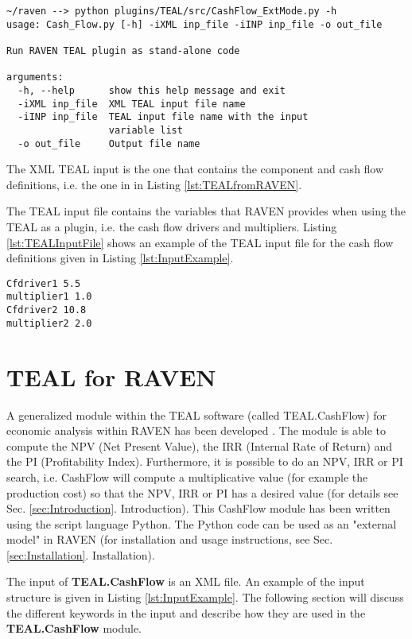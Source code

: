 \small
\begin{lstlisting}[caption=TEAL run as stand-alone python code, label=lst:TEALAsCode]
~/raven --> python plugins/TEAL/src/CashFlow_ExtMode.py -h
usage: Cash_Flow.py [-h] -iXML inp_file -iINP inp_file -o out_file

Run RAVEN TEAL plugin as stand-alone code

arguments:
  -h, --help      show this help message and exit
  -iXML inp_file  XML TEAL input file name
  -iINP inp_file  TEAL input file name with the input
                  variable list
  -o out_file     Output file name
\end{lstlisting}
\normalsize

The XML TEAL input is the one that contains the component and cash flow definitions, i.e. the one in  in Listing \ref{lst:TEALfromRAVEN}.

The TEAL input file contains the variables that RAVEN provides when using the TEAL as a plugin, i.e. the cash flow drivers and multipliers. Listing \ref{lst:TEALInputFile} shows an example of the TEAL input file for the cash flow definitions given in Listing \ref{lst:InputExample}.

\begin{lstlisting}[caption=TEAL run as stand-alone python code, label=lst:TEALInputFile]
Cfdriver1 5.5
multiplier1 1.0
Cfdriver2 10.8
multiplier2 2.0
\end{lstlisting}

\section{TEAL for RAVEN}
A generalized module within the TEAL software (called TEAL.CashFlow) for economic analysis within RAVEN has been developed \cite{MSApril2017}. The module is able to compute
the NPV (Net Present Value), the IRR (Internal Rate of Return) and the PI (Profitability Index). Furthermore, it is possible to
do an NPV, IRR or PI search, i.e. CashFlow will compute a multiplicative value (for example the production cost) so that the
NPV, IRR or PI has a desired value (for details see Sec. \ref{sec:Introduction}. Introduction). This CashFlow module has been written using the script language Python.
The Python code can be used as an "external model" in RAVEN (for installation and usage instructions, see Sec. \ref{sec:Installation}. Installation).

The input of \textbf{TEAL.CashFlow} is an XML file. An example of the input structure is given in Listing \ref{lst:InputExample}. The following section will discuss the
 different keywords in the input and describe how they are used in the \textbf{TEAL.CashFlow} module.

